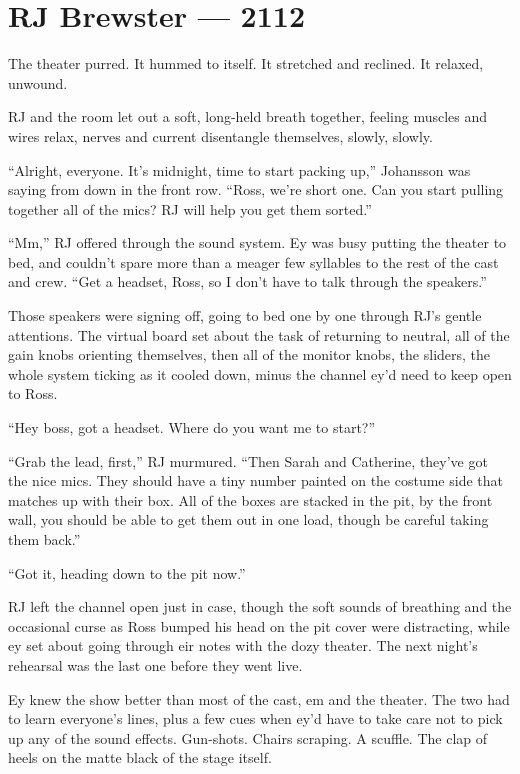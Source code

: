 \hypertarget{rj-brewster-2112}{%
\chapter*{RJ Brewster — 2112}\label{rj-brewster-2112}}

The theater purred. It hummed to itself. It stretched and reclined. It relaxed, unwound.

RJ and the room let out a soft, long-held breath together, feeling muscles and wires relax, nerves and current disentangle themselves, slowly, slowly.

``Alright, everyone. It's midnight, time to start packing up,'' Johansson was saying from down in the front row. ``Ross, we're short one. Can you start pulling together all of the mics? RJ will help you get them sorted.''

``Mm,'' RJ offered through the sound system. Ey was busy putting the theater to bed, and couldn't spare more than a meager few syllables to the rest of the cast and crew. ``Get a headset, Ross, so I don't have to talk through the speakers.''

Those speakers were signing off, going to bed one by one through RJ's gentle attentions. The virtual board set about the task of returning to neutral, all of the gain knobs orienting themselves, then all of the monitor knobs, the sliders, the whole system ticking as it cooled down, minus the channel ey'd need to keep open to Ross.

``Hey boss, got a headset. Where do you want me to start?''

``Grab the lead, first,'' RJ murmured. ``Then Sarah and Catherine, they've got the nice mics. They should have a tiny number painted on the costume side that matches up with their box. All of the boxes are stacked in the pit, by the front wall, you should be able to get them out in one load, though be careful taking them back.''

``Got it, heading down to the pit now.''

RJ left the channel open just in case, though the soft sounds of breathing and the occasional curse as Ross bumped his head on the pit cover were distracting, while ey set about going through eir notes with the dozy theater. The next night's rehearsal was the last one before they went live.

Ey knew the show better than most of the cast, em and the theater. The two had to learn everyone's lines, plus a few cues when ey'd have to take care not to pick up any of the sound effects. Gun-shots. Chairs scraping. A scuffle. The clap of heels on the matte black of the stage itself.

